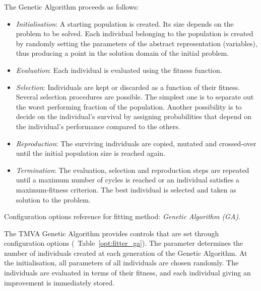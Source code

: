 The Genetic Algorithm proceeds as follows:
\begin{itemize}

\item {\em Initialisation}: A starting population is created. Its size depends 
      on the problem to be solved. Each individual belonging to the population is 
      created by randomly setting the parameters of the abstract 
      representation (variables), thus producing a point in the 
      solution domain of the initial problem.

\item {\em Evaluation}: Each individual is evaluated using the fitness function. 

\item {\em Selection}: Individuals are kept or discarded as a function of their 
      fitness. Several selection procedures are possible. The simplest one is to 
      separate out the worst performing fraction of the population. Another possibility 
      is to decide on the individual's survival by assigning probabilities that 
      depend on the individual's performance compared to the others. 

\item {\em Reproduction}: The surviving individuals are copied, mutated and 
      crossed-over until the initial population size is reached again. 

\item {\em Termination}: The evaluation, selection and reproduction steps are 
      repeated until a maximum number of cycles is reached or an individual 
      satisfies a maximum-fitness criterion. The best individual is selected 
      and taken as solution to the problem. 

\end{itemize}
\begin{option}[t]

\caption[.]{\optionCaptionSize 
     Configuration options reference for fitting method: {\em Genetic Algorithm (GA)}.
}
\label{opt:fitter_ga}
\end{option}
The TMVA Genetic Algorithm provides controls that are set through configuration options 
(\cf\  Table~\ref{opt:fitter_ga}). 
The parameter  determines the number of individuals 
created at each generation of the Genetic Algorithm. At 
the initialisation, all parameters of all individuals are chosen randomly.  
The individuals are evaluated in terms of their fitness, and each individual 
giving an improvement is immediately stored.

